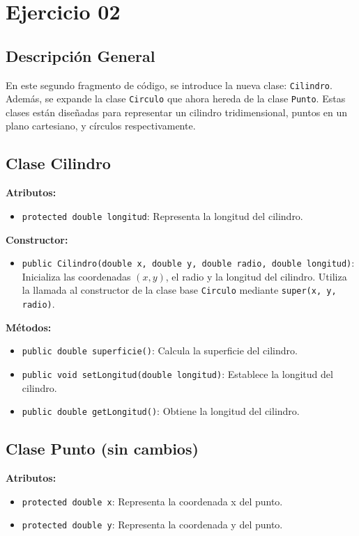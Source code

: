 \section{Ejercicio 02}

\subsection{Descripción General}
En este segundo fragmento de código, se introduce la nueva clase: \texttt{Cilindro}. Además, se expande la clase \texttt{Circulo} que ahora hereda de la clase \texttt{Punto}. Estas clases están diseñadas para representar un cilindro tridimensional, puntos en un plano cartesiano, y círculos respectivamente.

\subsection{Clase Cilindro}
\textbf{Atributos:}
\begin{itemize}
    \item \texttt{protected double longitud}: Representa la longitud del cilindro.
\end{itemize}

\textbf{Constructor:}
\begin{itemize}
    \item \texttt{public Cilindro(double x, double y, double radio, double longitud)}: Inicializa las coordenadas \((x, y)\), el radio y la longitud del cilindro. Utiliza la llamada al constructor de la clase base \texttt{Circulo} mediante \texttt{super(x, y, radio)}.
\end{itemize}

\textbf{Métodos:}
\begin{itemize}
    \item \texttt{public double superficie()}: Calcula la superficie del cilindro.
    \item \texttt{public void setLongitud(double longitud)}: Establece la longitud del cilindro.
    \item \texttt{public double getLongitud()}: Obtiene la longitud del cilindro.
\end{itemize}

\subsection{Clase Punto (sin cambios)}
\textbf{Atributos:}
\begin{itemize}
    \item \texttt{protected double x}: Representa la coordenada x del punto.
    \item \texttt{protected double y}: Representa la coordenada y del punto.
\end{itemize}

